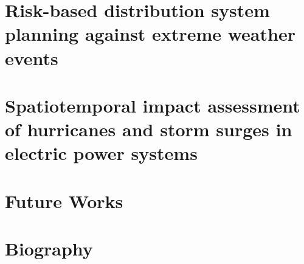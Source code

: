\documentclass[hidelinks, 12pt]{article}
\begin{document}



\newpage


\newpage
\tableofcontents
\newpage







\section{Risk-based distribution system planning against extreme weather events} 

\newpage


\clearpage
\section{Spatiotemporal impact assessment of hurricanes and storm surges in electric power systems}


\clearpage
\section{Future Works}\label{sec:future_Work}



\newpage
\section{Biography}


\newpage



\end{document}
